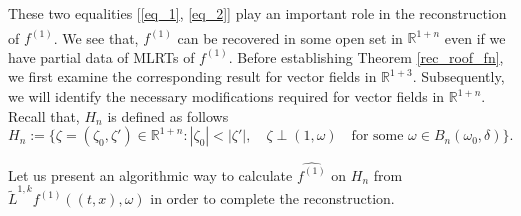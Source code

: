 \documentclass[11pt,a4paper,reqno]{amsart}
\newcommand{\R}{\mathbb{R}}
\newcommand{\Bdl}{B_{n}(\omega_0,\delta)}
\newcommand{\om}{\omega}
\begin{document}
These two equalities [\eqref{eq_1}, \eqref{eq_2}] play an important role in the reconstruction of $f^{(1)}$. We see that, $\widehat{f^{(1)}}$ can be recovered in some open set in $\R^{1+n}$ even if we have partial data of MLRTs of $f^{(1)}$.
Before establishing Theorem \ref{rec_roof_fn}, we first examine the corresponding result for vector fields in $\R^{1+3}$. Subsequently, we will identify the necessary modifications required for vector fields in $\R^{1+n}$. Recall that, $H_n$ is defined as follows 
	\[
	H_n := \{\zeta=(\zeta_0,\zeta') \in \R^{1+n}:|\zeta_0|<|\zeta'|,\quad \zeta \perp (1,\om) \quad \text{for some }\om \in \Bdl \}. 
	\]
	
	Let us present an algorithmic way to calculate $\widehat{f^{(1)}}$ on $H_n$ from $\tilde{L}^{1,k}f^{(1)}((t,x),\omega)$ in order to complete the reconstruction.
	
\end{document}
